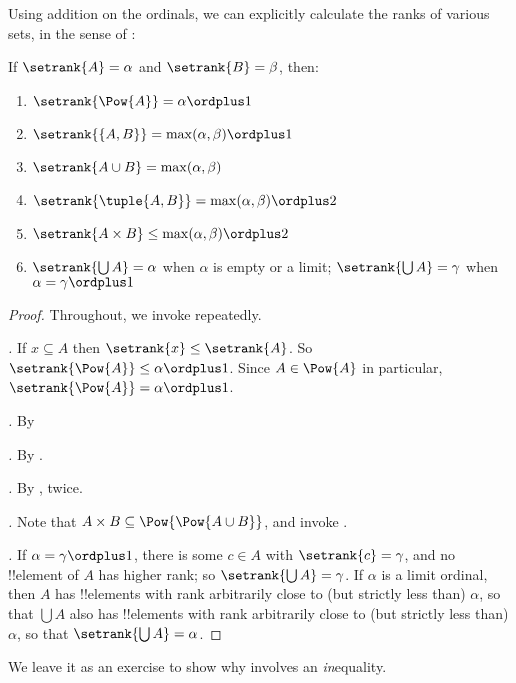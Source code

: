 \documentclass[../../../include/open-logic-section]{subfiles}
\begin{document}

Using addition on the ordinals, we can explicitly calculate the ranks
of various sets, in the sense of :

\begin{lem}
If $\setrank{A} = \alpha$ and $\setrank{B} = \beta$, then:
\begin{enumerate}
	\item{} $\setrank{\Pow{A}} = \alpha\ordplus 1$
	\item{} $\setrank{\{A, B\}} = \max(\alpha,
	\beta) \ordplus 1$
	\item{} $\setrank{A \cup B} = \max(\alpha,
	\beta)$
	\item{} $\setrank{\tuple{A,B}} = \max(\alpha,
	\beta) \ordplus  2$
	\item{} $\setrank{A \times B} \leq \max(\alpha,
	\beta) \ordplus  2$
	\item{} $\setrank{\bigcup A} = \alpha$ when
	$\alpha$ is empty or a limit; $\setrank{\bigcup A} = \gamma$ when
	$\alpha = \gamma\ordplus 1$
\end{enumerate}
\end{lem}

\begin{proof}
Throughout, we invoke 
repeatedly.

\emph{.} If $x \subseteq A$ then $\setrank{x} \leq
\setrank{A}$. So $\setrank{\Pow{A}} \leq \alpha \ordplus  1$. Since $A
\in \Pow{A}$ in particular, $\setrank{\Pow{A}} = \alpha \ordplus  1$.

\emph{.} By 

\emph{.} By .

\emph{.} By , twice.

\emph{.} Note that $A \times B \subseteq
\Pow{\Pow{A \cup B}}$, and invoke . 

\emph{.} If $\alpha = \gamma\ordplus 1$, there is
some $c \in A$ with $\setrank{c} = \gamma$, and no !!{element} of $A$
has higher rank; so $\setrank{\bigcup A} = \gamma$. If $\alpha$ is a
limit ordinal, then $A$ has !!{element}s with rank arbitrarily close
to (but strictly less than) $\alpha$, so that $\bigcup A$ also has
!!{element}s with rank arbitrarily close to (but strictly less than)
$\alpha$, so that $\setrank{\bigcup A} = \alpha$.
\end{proof}
\noindent
We leave it as an exercise to show why  involves an
\emph{in}equality.
\end{document}
